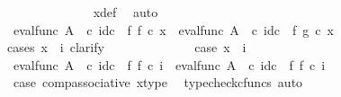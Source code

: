 \begin{isabellebody}
\ \ \ \ \ \ \ \ \ \ \ \ \isamarkupfalse%
\ x{\isacharunderscore}{\kern0pt}def\ \isamarkupfalse%
\ auto\isanewline
\ \ \ \ \ \ \ \ \ \ \isamarkupfalse%
\ {\isachardoublequoteopen}{\isacharparenleft}{\kern0pt}eval{\isacharunderscore}{\kern0pt}func\ A\ {\isasymOmega}\ {\isasymcirc}\isactrlsub c\ id\isactrlsub c\ {\isasymOmega}\ {\isasymtimes}\isactrlsub f\ f{\isacharparenright}{\kern0pt}\ {\isasymcirc}\isactrlsub c\ x\ {\isacharequal}{\kern0pt}\ {\isacharparenleft}{\kern0pt}eval{\isacharunderscore}{\kern0pt}func\ A\ {\isasymOmega}\ {\isasymcirc}\isactrlsub c\ id\isactrlsub c\ {\isasymOmega}\ {\isasymtimes}\isactrlsub f\ g{\isacharparenright}{\kern0pt}\ {\isasymcirc}\isactrlsub c\ x{\isachardoublequoteclose}\isanewline
\ \ \ \ \ \ \ \ \ \ \isamarkupfalse%
{\isacharparenleft}{\kern0pt}cases\ {\isachardoublequoteopen}{\isacharparenleft}{\kern0pt}x\ {\isacharequal}{\kern0pt}\ {\isasymlangle}{\isasymf}{\isacharcomma}{\kern0pt}i{\isasymrangle}{\isacharparenright}{\kern0pt}{\isachardoublequoteclose}{\isacharcomma}{\kern0pt}\ clarify{\isacharparenright}{\kern0pt}\isanewline
\ \ \ \ \ \ \ \ \ \ \ \ \isamarkupfalse%
\ case{}{\isacharcolon}{\kern0pt}\ {\isachardoublequoteopen}x\ {\isacharequal}{\kern0pt}\ {\isasymlangle}{\isasymf}{\isacharcomma}{\kern0pt}i{\isasymrangle}{\isachardoublequoteclose}\isanewline
\ \ \ \ \ \ \ \ \ \ \ \ \isamarkupfalse%
\ {\isachardoublequoteopen}{\isacharparenleft}{\kern0pt}eval{\isacharunderscore}{\kern0pt}func\ A\ {\isasymOmega}\ {\isasymcirc}\isactrlsub c\ {\isacharparenleft}{\kern0pt}id\isactrlsub c\ {\isasymOmega}\ {\isasymtimes}\isactrlsub f\ f{\isacharparenright}{\kern0pt}{\isacharparenright}{\kern0pt}\ {\isasymcirc}\isactrlsub c\ {\isasymlangle}{\isasymf}{\isacharcomma}{\kern0pt}i{\isasymrangle}\ {\isacharequal}{\kern0pt}\ eval{\isacharunderscore}{\kern0pt}func\ A\ {\isasymOmega}\ {\isasymcirc}\isactrlsub c\ {\isacharparenleft}{\kern0pt}{\isacharparenleft}{\kern0pt}id\isactrlsub c\ {\isasymOmega}\ {\isasymtimes}\isactrlsub f\ f{\isacharparenright}{\kern0pt}\ {\isasymcirc}\isactrlsub c\ {\isasymlangle}{\isasymf}{\isacharcomma}{\kern0pt}i{\isasymrangle}{\isacharparenright}{\kern0pt}{\isachardoublequoteclose}\isanewline
\ \ \ \ \ \ \ \ \ \ \ \ \ \ \isamarkupfalse%
\ case{}\ comp{\isacharunderscore}{\kern0pt}associative{}\ x{\isacharunderscore}{\kern0pt}type\ \isamarkupfalse%
\ {\isacharparenleft}{\kern0pt}typecheck{\isacharunderscore}{\kern0pt}cfuncs{\isacharcomma}{\kern0pt}\ auto{\isacharparenright}{\kern0pt}\isanewline

\end{isabellebody}

